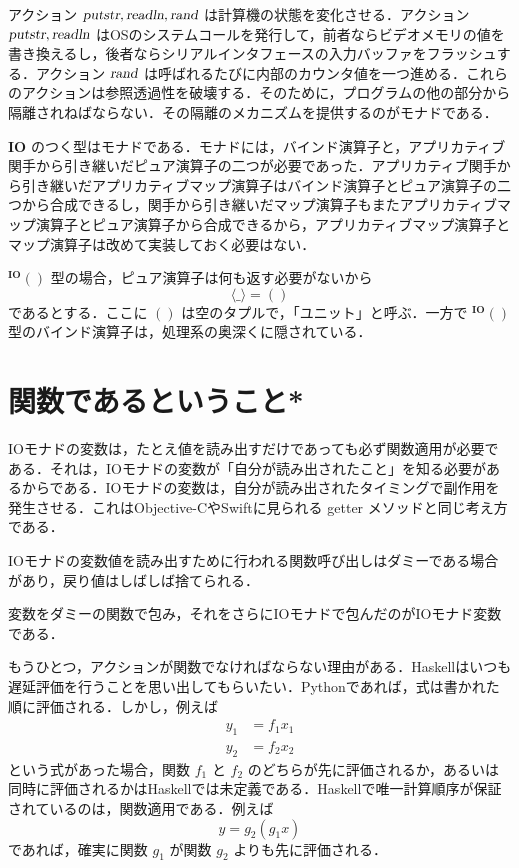 \documentclass[a4paper,twocolumn]{jsbook}
\newcommand{\programminglanguage}[1]{\textsf{#1}}
\newcommand{\haskell}{\programminglanguage{Haskell}}
\newcommand{\objectivec}{\programminglanguage{Objective-C}}
\newcommand{\python}{\programminglanguage{Python}}
\newcommand{\swift}{\programminglanguage{Swift}}
\newcommand{\mAnyParam}{\_}
\newcommand{\mAction}[1]{\textsl{#1}}
\DeclareMathOperator{\mReadLn}{\mAction{readln}}
\DeclareMathOperator{\mPutStr}{\mAction{putstr}}
\DeclareMathOperator{\mRand}{\mAction{rand}}
\newcommand{\mType}[1]{\mathbf{#1}}
\newcommand{\mPureWith}[1]{\langle#1\rangle}
\newcommand{\mTupleWith}[1]{\left(#1\right)}
\newcommand{\mIOType}{\mType{IO}}
\newcommand{\mUnitType}{\mType{()}}
\newcommand{\mIOUnitType}{{}^\mIOType\mUnitType}
\begin{document}
アクション $\mPutStr,\mReadLn,\mRand$ は計算機の状態を変化させる．アクション $\mPutStr,\mReadLn$ はOSのシステムコールを発行して，前者ならビデオメモリの値を書き換えるし，後者ならシリアルインタフェースの入力バッファをフラッシュする．アクション $\mRand$ は呼ばれるたびに内部のカウンタ値を一つ進める．これらのアクションは参照透過性を破壊する．そのために，プログラムの他の部分から隔離されねばならない．その隔離のメカニズムを提供するのがモナドである．

$\mIOType$ のつく型はモナドである．モナドには，バインド演算子と，アプリカティブ関手から引き継いだピュア演算子の二つが必要であった．アプリカティブ関手から引き継いだアプリカティブマップ演算子はバインド演算子とピュア演算子の二つから合成できるし，関手から引き継いだマップ演算子もまたアプリカティブマップ演算子とピュア演算子から合成できるから，アプリカティブマップ演算子とマップ演算子は改めて実装しておく必要はない．

$\mIOUnitType$ 型の場合，ピュア演算子は何も返す必要がないから
\begin{equation}
\mPureWith{\mAnyParam}=\mTupleWith{}
\end{equation}
であるとする．ここに $\mTupleWith{}$ は空のタプルで，「ユニット」と呼ぶ．一方で $\mIOUnitType$ 型のバインド演算子は，処理系の奥深くに隠されている．




\section{関数であるということ*}

IOモナドの変数は，たとえ値を読み出すだけであっても必ず関数適用が必要である．それは，IOモナドの変数が「自分が読み出されたこと」を知る必要があるからである．IOモナドの変数は，自分が読み出されたタイミングで副作用を発生させる．これは\objectivec や\swift に見られる getter メソッドと同じ考え方である．

IOモナドの変数値を読み出すために行われる関数呼び出しはダミーである場合があり，戻り値はしばしば捨てられる．

変数をダミーの関数で包み，それをさらにIOモナドで包んだのがIOモナド変数である．

もうひとつ，アクションが関数でなければならない理由がある．\haskell はいつも遅延評価を行うことを思い出してもらいたい．\python であれば，式は書かれた順に評価される．しかし，例えば
\begin{align}
y_1&=f_1x_1\\
y_2&=f_2x_2
\end{align}
という式があった場合，関数 $f_1$ と $f_2$ のどちらが先に評価されるか，あるいは同時に評価されるかは\haskell では未定義である．\haskell で唯一計算順序が保証されているのは，関数適用である．例えば
\begin{equation}
y=g_2(g_1x)
\end{equation}
であれば，確実に関数 $g_1$ が関数 $g_2$ よりも先に評価される．
\end{document}
